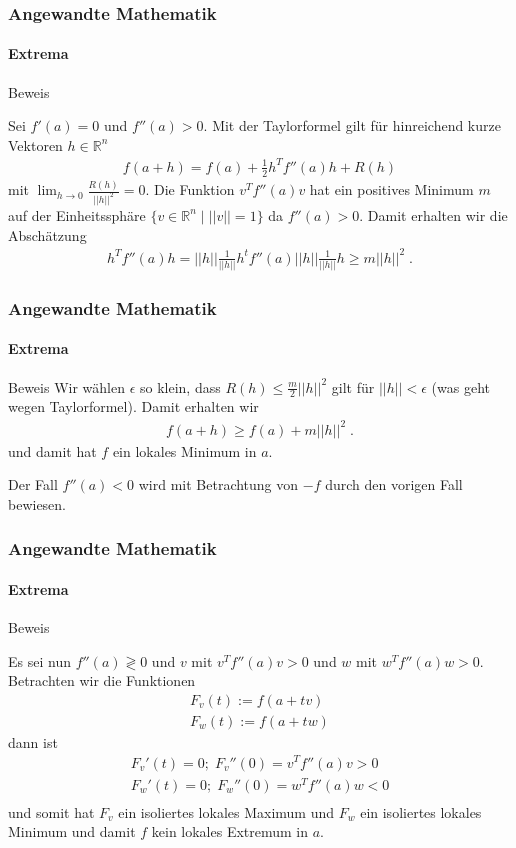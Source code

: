 \documentclass{beamer}
\begin{document}
\begin{frame}
    \frametitle{Angewandte Mathematik}
\framesubtitle{Extrema}
    \begin{block}{Beweis}

Sei $f'(a) = 0$ und $f''(a) > 0$. Mit der Taylorformel gilt für hinreichend kurze Vektoren $h \in \mathbb{R}^n$
\begin{align*}
f(a + h) = f(a) + \frac{1}{2} h^T f''(a) h + R(h)
\end{align*}
mit $\lim_{h \to 0} \frac{R(h)}{ ||h||^2} = 0$. 
Die Funktion $v^T f''(a) v $ hat ein positives Minimum  $m$ auf der Einheitssphäre $\{ v \in \mathbb{R}^n \; | \; ||v|| = 1 \}$ da $f''(a) > 0$.
Damit erhalten wir die Abschätzung
\begin{align*}
 h^T f''(a) h  = ||h|| \frac{1}{||h||} h^t  f''(a)  ||h|| \frac{1}{||h||} h \geq m ||h||^2 \;.
\end{align*}
\end{block}
 \end{frame}



\begin{frame}
    \frametitle{Angewandte Mathematik}
\framesubtitle{Extrema}
    \begin{block}{Beweis}
Wir wählen $\epsilon$ so klein, dass $R(h) \leq \frac{m}{2}  ||h||^2$ gilt für $||h|| < \epsilon$  (was geht wegen Taylorformel).
Damit erhalten wir
\begin{align*}
f(a + h) \geq f(a) +  m ||h||^2 \;.
\end{align*}
und damit hat $f$ ein lokales Minimum in $a$.

Der Fall $f''(a) < 0$ wird mit Betrachtung von $-f$ durch den vorigen Fall bewiesen.
\end{block}
 \end{frame}



\begin{frame}
    \frametitle{Angewandte Mathematik}
\framesubtitle{Extrema}
    \begin{block}{Beweis}


Es sei nun $f''(a) \gtrless 0$ und $v$ mit $v^T f''(a) v > 0$ und $w$ mit $w^T f''(a) w > 0$. Betrachten wir die Funktionen
\begin{align*}
F_v (t) := f(a + tv) \\
F_w(t) := f(a +tw)
\end{align*}
dann ist 
\begin{align*}
F_v' (t) = 0; \; F_v''(0) = v^T f''(a) v > 0 \\
F_w' (t) = 0; \; F_w''(0) = w^T f''(a) w < 0 \\
\end{align*}
und somit hat $F_v$ ein isoliertes lokales Maximum und $F_w$ ein isoliertes lokales Minimum und damit $f$ kein lokales Extremum  in  $a$.
\end{block}
 \end{frame}
\end{document}
